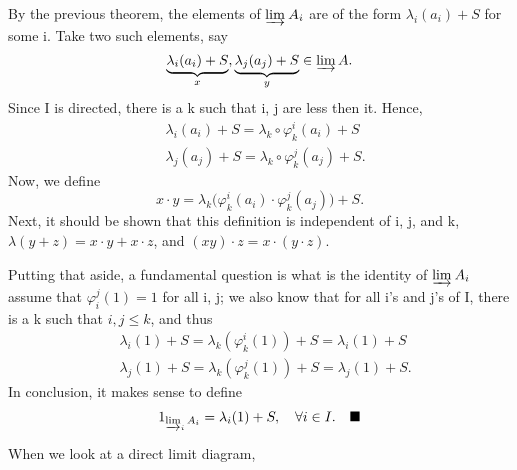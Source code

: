 \documentclass[../category_theory.tex]{subfiles}
\begin{document}
\begin{proof*}
	By the previous theorem, the elements of \(\varinjlim_{}A_{i}\) are of the form \(\lambda_{i}(a_{i})+S\) for some i. Take two such elements, say
	\[
		\underbrace{\lambda_{i}(a_{i})+S}_{x}, \underbrace{\lambda_{j}(a_{j})+S}_{y}\in \varinjlim_{}A.
	\]
	Since I is directed, there is a k such that i, j are less then it. Hence,
	\begin{align*}
		 & \lambda_{i}(a_{i})+S=\lambda_{k}\circ \varphi_{k}^{i}(a_{i})+S  \\
		 & \lambda_{j}(a_{j})+S=\lambda_{k}\circ \varphi_{k}^{j}(a_{j})+S.
	\end{align*}
	Now, we define
	\[
		x \cdot y = \lambda_{k}\biggl(\varphi_{k}^{i}(a_{i})\cdot \varphi_{k}^{j}(a_{j})\biggr)+S.
	\]
	Next, it should be shown that this definition is independent of i, j, and k, \(\lambda(y+z)=x \cdot y+ x \cdot z\), and \((xy)\cdot z=x \cdot (y \cdot z).\)

	Putting that aside, a fundamental question is what is the identity of \(\varinjlim_{}A_{i}\) assume that \(\varphi_{i}^{j}(1)=1\) for all i, j; we also know that for all i's and j's of I, there is a k such that \(i, j\leq k\), and thus
	\begin{align*}
		 & \lambda_{i}(1)+S=\lambda_{k}(\varphi_{k}^{i}(1))+S=\lambda_{i}(1)+S  \\
		 & \lambda_{j}(1)+S=\lambda_{k}(\varphi_{k}^{j}(1))+S=\lambda_{j}(1)+S.
	\end{align*}
	In conclusion, it makes sense to define
	\[
		1_{\varinjlim_{i}A_{i}}=\lambda_{i}(1)+S,\quad \forall i\in I.\quad \text{$\blacksquare$}
	\]
\end{proof*}
When we look at a direct limit diagram,
\begin{center}
\end{center}
\end{document}
